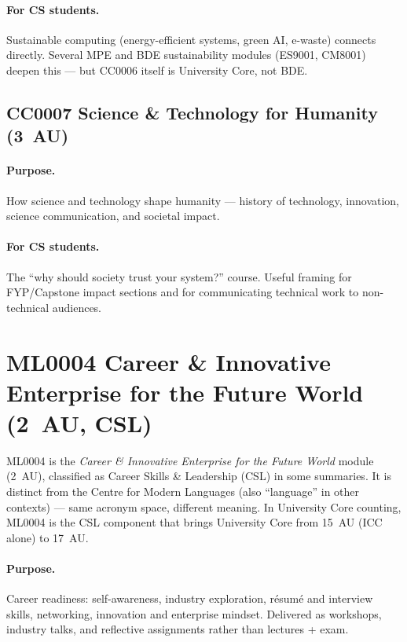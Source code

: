 \paragraph{For CS students.} Sustainable computing (energy-efficient systems, green AI, e-waste) connects directly. Several MPE and BDE sustainability modules (ES9001, CM8001) deepen this --- but CC0006 itself is University Core, not BDE.

\subsection{CC0007 Science \& Technology for Humanity (3~AU)}
\paragraph{Purpose.} How science and technology shape humanity --- history of technology, innovation, science communication, and societal impact.

\paragraph{For CS students.} The ``why should society trust your system?'' course. Useful framing for FYP/Capstone impact sections and for communicating technical work to non-technical audiences.

\section{ML0004 Career \& Innovative Enterprise for the Future World (2~AU, CSL)}
\label{sec:ml0004}

\begin{definition}
ML0004 is the \emph{Career \& Innovative Enterprise for the Future World} module (2~AU), classified as Career Skills \& Leadership (CSL) in some summaries. It is distinct from the Centre for Modern Languages (also ``language'' in other contexts) --- same acronym space, different meaning. In University Core counting, ML0004 is the CSL component that brings University Core from 15~AU (ICC alone) to 17~AU.
\end{definition}

\paragraph{Purpose.} Career readiness: self-awareness, industry exploration, r\'esum\'e and interview skills, networking, innovation and enterprise mindset. Delivered as workshops, industry talks, and reflective assignments rather than lectures + exam.

